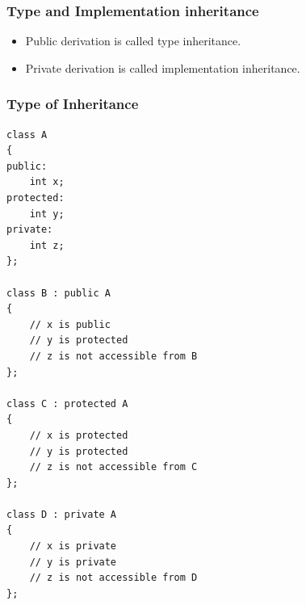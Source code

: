 \documentclass{beamer}
\newtheorem{Key points}{Key points}
\newcommand\Fontvi{\fontsize{5}{6.2}\selectfont}
\begin{document}
\begin{frame}[fragile]
\frametitle{Type and Implementation inheritance}
\begin{itemize}
\item Public derivation is called type inheritance.
\item Private derivation is called implementation inheritance.
\end{itemize}
\end{frame}
\begin{frame}[fragile]
\frametitle{Type of Inheritance}
\Fontvi
\begin{lstlisting}
class A 
{
public:
    int x;
protected:
    int y;
private:
    int z;
};

class B : public A
{
    // x is public
    // y is protected
    // z is not accessible from B
};

class C : protected A
{
    // x is protected
    // y is protected
    // z is not accessible from C
};

class D : private A
{
    // x is private
    // y is private
    // z is not accessible from D
};
\end{lstlisting}
\end{frame}
\end{document}
